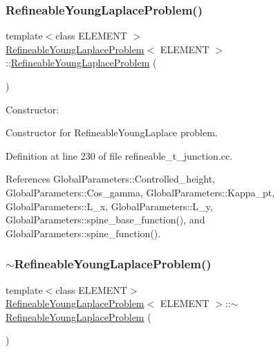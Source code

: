 \subsubsection{\texorpdfstring{Refineable\+Young\+Laplace\+Problem()}{RefineableYoungLaplaceProblem()}\hspace{0.1cm}{\footnotesize\ttfamily [1/3]}}
{\footnotesize\ttfamily template$<$class E\+L\+E\+M\+E\+NT $>$ \\
\hyperlink{classRefineableYoungLaplaceProblem}{Refineable\+Young\+Laplace\+Problem}$<$ E\+L\+E\+M\+E\+NT $>$\+::\hyperlink{classRefineableYoungLaplaceProblem}{Refineable\+Young\+Laplace\+Problem} (\begin{DoxyParamCaption}{ }\end{DoxyParamCaption})}



Constructor\+: 

Constructor for Refineable\+Young\+Laplace problem. 

Definition at line 230 of file refineable\+\_\+t\+\_\+junction.\+cc.



References Global\+Parameters\+::\+Controlled\+\_\+height, Global\+Parameters\+::\+Cos\+\_\+gamma, Global\+Parameters\+::\+Kappa\+\_\+pt, Global\+Parameters\+::\+L\+\_\+x, Global\+Parameters\+::\+L\+\_\+y, Global\+Parameters\+::spine\+\_\+base\+\_\+function(), and Global\+Parameters\+::spine\+\_\+function().

\mbox{\label{classRefineableYoungLaplaceProblem_a24b45d5ecdd1d7dbb678e7f74777bf41}} 
\subsubsection{\texorpdfstring{$\sim$\+Refineable\+Young\+Laplace\+Problem()}{~RefineableYoungLaplaceProblem()}\hspace{0.1cm}{\footnotesize\ttfamily [1/3]}}
{\footnotesize\ttfamily template$<$class E\+L\+E\+M\+E\+NT$>$ \\
\hyperlink{classRefineableYoungLaplaceProblem}{Refineable\+Young\+Laplace\+Problem}$<$ E\+L\+E\+M\+E\+NT $>$\+::$\sim$\hyperlink{classRefineableYoungLaplaceProblem}{Refineable\+Young\+Laplace\+Problem} (\begin{DoxyParamCaption}{ }\end{DoxyParamCaption})\hspace{0.3cm}{\ttfamily [inline]}}




